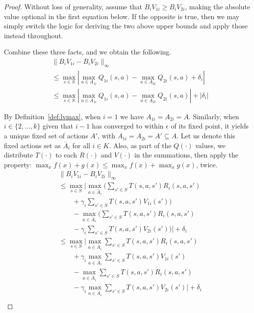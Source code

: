 \begin{proof}
Without loss of generality, assume that $B_i V_{1i} \geq B_i V_{2i}$, making the absolute value optional in the first equation below. If the opposite is true, then we may simply switch the logic for deriving the two above upper bounds and apply those instead throughout.

Combine these three facts, and we obtain the following.
\begin{align*}
    &\| B_i V_{1i} - B_i V_{2i} \|_\infty \\
    &\leq \max_{s \in S} | \max_{a \in A_{1i}} Q_{1i}(s, a) - \max_{a \in A_{2i}} Q_{2i}(s, a) + \delta_i | \\
    &\leq \max_{s \in S} | \max_{a \in A_{1i}} Q_{1i}(s, a) - \max_{a \in A_{2i}} Q_{2i}(s, a)| + |\delta_i|
\end{align*}

By Definition~\ref{def:lvmax}, when $i=1$ we have $A_{1i} = A_{2i} = A$. Similarly, when $i \in \{2, \ldots, k\}$ given that $i-1$ has converged to within $\epsilon$ of its fixed point, it yields a unique fixed set of actions $A'$, with $A_{1i} = A_{2i} = A' \subseteq A$. Let us denote this fixed actions set as $\bar{A}_i$ for all $i \in K$. Also, as part of the $Q(\cdot)$ values, we distribute $T(\cdot)$ to each $R(\cdot)$ and $V(\cdot)$ in the summations, then apply the property: $\max_x f(x) + g(x) \leq \max_x f(x) + \max_x g(x)$, twice.
\begin{align*}
    &\| B_i V_{1i} - B_i V_{2i} \|_\infty \\
    &\leq \max_{s \in S} \Big| \max_{a \in \bar{A}_i} \Big( \sum_{s' \in S} T(s, a, s') R_i(s, a, s') \\
    &\quad \quad + \gamma_i \sum_{s' \in S} T(s, a, s') V_{1i}(s') \Big) \\
    &\quad \quad - \max_{a \in \bar{A}_i} \Big( \sum_{s' \in S} T(s, a, s') R_i(s, a, s') \\
    &\quad \quad - \gamma_i \sum_{s' \in S} T(s, a, s') V_{2i}(s') \Big) \Big| + \delta_i \\
    &\leq \max_{s \in S} \Big| \max_{a \in \bar{A}_i} \sum_{s' \in S} T(s, a, s') R_i(s, a, s') \\
    &\quad \quad + \gamma_i \max_{a \in \bar{A}_i} \sum_{s' \in S} T(s, a, s') V_{1i}(s') \\
    &\quad \quad - \max_{a \in \bar{A}_i} \sum_{s' \in S} T(s, a, s') R_i(s, a, s') \\
    &\quad \quad - \gamma_i \max_{a \in \bar{A}_i} \sum_{s' \in S} T(s, a, s') V_{2i}(s') \Big| + \delta_i \\

\end{align*}
\end{proof}

